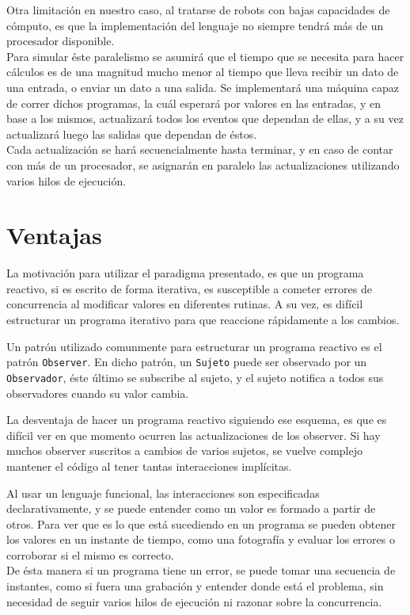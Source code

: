   Otra limitación en nuestro caso, al tratarse de robots con bajas capacidades de cómputo, es que
la implementación del lenguaje no siempre tendrá más de un procesador disponible.\\
  Para simular éste paralelismo se asumirá que el tiempo que se necesita para hacer cálculos es de
una magnitud mucho menor al tiempo que lleva recibir un dato de una entrada, o enviar un dato a una salida.
  Se implementará una máquina capaz de correr dichos programas, la cuál esperará por valores en las entradas,
y en base a los mismos, actualizará todos los eventos que dependan de ellas, y a su vez actualizará luego
las salidas que dependan de éstos.\\
  Cada actualización se hará secuencialmente hasta terminar, y en caso de contar con más de un procesador, se
asignarán en paralelo las actualizaciones utilizando varios hilos de ejecución.\\

\section{Ventajas}

  La motivación para utilizar el paradigma presentado, es que un programa reactivo, si es escrito de
forma iterativa, es susceptible a cometer errores de concurrencia al modificar valores en diferentes
rutinas. A su vez, es difícil estructurar un programa iterativo para que reaccione rápidamente a
los cambios.

  Un patrón utilizado comunmente para estructurar un programa reactivo es el patrón \texttt{Observer}.
En dicho patrón, un \texttt{Sujeto} puede ser observado por un \texttt{Observador}, éste último se
subscribe al sujeto, y el sujeto notifica a todos sus observadores cuando su valor cambia.
  
  La desventaja de hacer un programa reactivo siguiendo ese esquema, es que es difícil ver en que
momento ocurren las actualizaciones de los observer. Si hay muchos observer suscritos a cambios
de varios sujetos, se vuelve complejo mantener el código al tener tantas interacciones implícitas.

  Al usar un lenguaje funcional, las interacciones son especificadas declarativamente, y se puede
entender como un valor es formado a partir de otros.
  Para ver que es lo que está sucediendo en un programa se pueden obtener los valores en un instante
de tiempo, como una fotografía y evaluar los errores o corroborar si el mismo es correcto.\\
  De ésta manera si un programa tiene un error, se puede tomar una secuencia de instantes,
como si fuera una grabación y entender donde está el problema,
sin necesidad de seguir varios hilos de ejecución ni razonar sobre la concurrencia.

